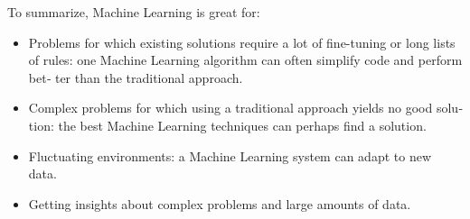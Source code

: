 To summarize, Machine Learning is great for:
\begin{itemize}
\item Problems for which existing solutions require a lot of fine-tuning or long lists of
rules: one Machine Learning algorithm can often simplify code and perform bet‐
ter than the traditional approach.
\item
 Complex problems for which using a traditional approach yields no good solu‐
tion: the best Machine Learning techniques can perhaps find a solution.
\item
 Fluctuating environments: a Machine Learning system can adapt to new data.
\item
 Getting insights about complex problems and large amounts of data.
\end{itemize}


